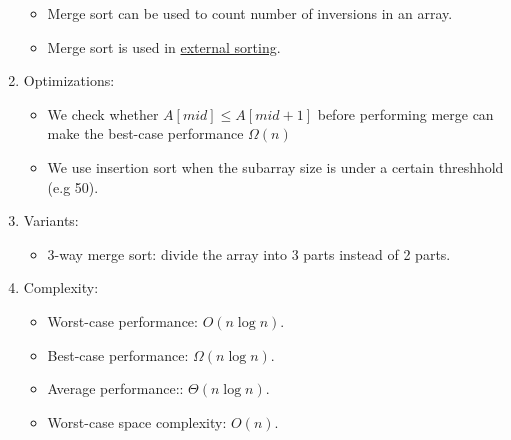 \documentclass[12pt]{article}
\begin{document}
\begin{enumerate}
\begin{itemize}
            \item Merge sort can be used to count number of inversions in an array.
            \item Merge sort is used in \href{https://en.wikipedia.org/wiki/External_sorting}{external sorting}.
        \end{itemize}
        \item Optimizations:
        \begin{itemize}
            \item We check whether $A[mid]\leq A[mid+1]$ before performing merge can make the best-case performance $\Omega(n)$
            \item We use insertion sort when the subarray size is under a certain threshhold (e.g 50).
        \end{itemize}
        \item Variants:
        \begin{itemize}
            \item 3-way merge sort: divide the array into 3 parts instead of 2 parts.
        \end{itemize}
        \item Complexity:
        \begin{itemize}
            \item Worst-case performance: $O(n\log n)$.
            \item Best-case performance: $\Omega(n\log n)$.
            \item Average performance:: $\Theta(n\log n)$.
            \item Worst-case space complexity: $O(n)$.
        \end{itemize}
    \end{enumerate}
\end{document}
